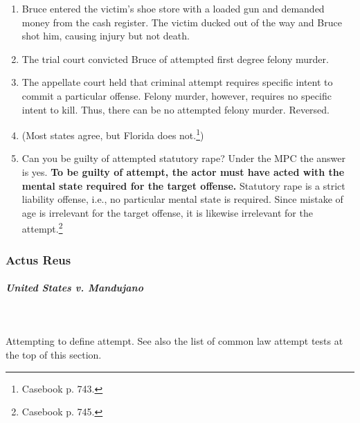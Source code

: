 \begin{enumerate}
    \item Bruce entered the victim's shoe store with a loaded gun and demanded 
    money from the cash register. The victim ducked out of the way and Bruce 
    shot him, causing injury but not death.
    \item The trial court convicted Bruce of attempted first degree felony 
    murder.
    \item The appellate court held that criminal attempt requires specific 
    intent to commit a particular offense. Felony murder, however, requires no 
    specific intent to kill. Thus, there can be no attempted felony murder.  
    Reversed.
    \item (Most states agree, but Florida does not.\footnote{Casebook p.  
    743.})
    \item Can you be guilty of attempted statutory rape? Under the MPC the 
    answer is yes. \textbf{To be guilty of attempt, the actor must have acted 
    with the mental state required for the target offense.} Statutory rape is 
    a strict liability offense, i.e., no particular mental state is required.  
    Since mistake of age is irrelevant for the target offense, it is likewise 
    irrelevant for the attempt.\footnote{Casebook p. 745.}
\end{enumerate}

\subsubsection{Actus Reus}

\paragraph{\emph{United States v. Mandujano}}
~\\\\
Attempting to define attempt. See also the list of common law attempt tests at 
the top of this section.

